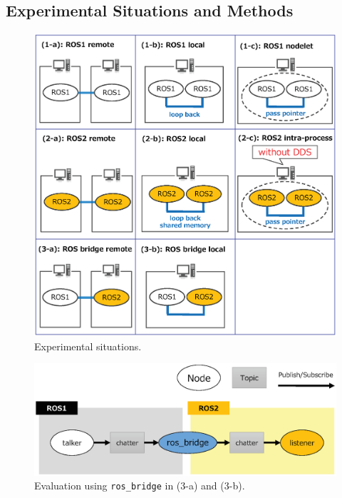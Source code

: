 \documentclass{sig-alternate-05-2015}
\begin{document}
\subsection{Experimental Situations and Methods}
\label{sec:orgheadline8}

\begin{figure}[t]
\centering
\includegraphics[width=1.0\linewidth]{../figure/eval_situation.eps}
\caption{\label{fig:orgparagraph5}
Experimental situations.}
\end{figure}

\begin{figure}[t]
\centering
\includegraphics[width=1.0\linewidth]{../figure/eval_method.eps}
\caption{\label{fig:orgparagraph6}
Evaluation using \texttt{ros\_bridge} in (3-a) and (3-b).}
\end{figure}
\end{document}
